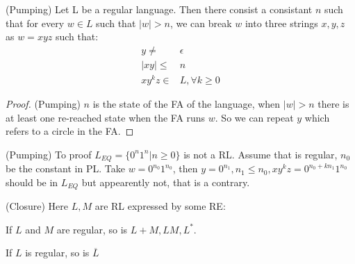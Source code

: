 
\usepackage{../../lectures_preamble}


    \begin{lemma}
        \label{lemma:Pumping}
        (Pumping) Let L be a regular language. Then there consist a consistant $n$ such that for every $w\in L$ such that $|w| >n$, we can break $w$ into three strings $x,y,z$ as $w=xyz$ such that:
        \begin{align}
            y\ne&\epsilon\nonumber\\
            |xy|\le&n\nonumber\\
            xy^{k}z\in&L,\forall k\ge 0\nonumber
        \end{align}
    \end{lemma}
    \begin{proof}
        \label{proof:Pumping}
        (Pumping) $n$ is the state of the FA of the language, when $|w| >n$ there is at least one re-reached state when the FA runs $w$. So we can repeat $y$ which refers to a circle in the FA.
    \end{proof}
    \begin{example}
        \label{example:Pumping}
        (Pumping) To proof $L_{EQ}=\{0^{n}1^{n}|n\ge 0\}$ is not a RL. Assume that is regular, $n_0$ be the constant in PL. Take $w=0^{n_0}1^{n_0}$, then $y=0^{n_1},n_1\le n_0,xy^{k}z=0^{n_0+kn_1}1^{n_0}$ should be in $L_{EQ}$ but appearently not, that is a contrary.
    \end{example}
    \begin{theorem}
        \label{theorem:Closure}
        (Closure) Here $L,M$ are RL expressed by some RE:

        If $L$ and $M$ are regular, so is $L+M,LM,L^{*}$.

        If $L$ is regular, so is $\overline{L}$ 
    \end{theorem}
